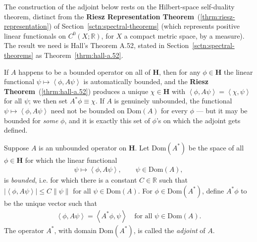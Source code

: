 The construction of the adjoint below rests on the Hilbert-space self-duality theorem, distinct from the \textbf{Riesz Representation Theorem}~(\ref{thrm:riesz-representation}) of Section~\ref{sctn:spectral-theorems} (which represents positive linear functionals on $C^0(X;\mathbb{R})$, for $X$ a compact metric space, by a measure). The result we need is Hall's Theorem A.52, stated in Section~\ref{sctn:spectral-theorems} as Theorem~\ref{thrm:hall-a.52}.

If $A$ happens to be a bounded operator on all of $\mathbf{H}$, then for any $\phi \in \mathbf{H}$ the linear functional $\psi \mapsto \left< \phi, A\psi \right>$ is automatically bounded, and the \textbf{Riesz Theorem}~(\ref{thrm:hall-a.52}) produces a unique $\chi \in \mathbf{H}$ with $\left< \phi, A\psi \right> = \left< \chi, \psi \right>$ for all $\psi$; we then set $A^*\phi \equiv \chi$. If $A$ is genuinely unbounded, the functional $\psi \mapsto \left< \phi, A\psi \right>$ need not be bounded on $\text{Dom}(A)$ for every $\phi$ — but it may be bounded for \textit{some} $\phi$, and it is exactly this set of $\phi$'s on which the adjoint gets defined.

\begin{definition}
    \label{def:hall-9.1}
    \leanok
    Suppose $A$ is an unbounded operator on $\mathbf{H}$. Let $\text{Dom}(A^*)$ be the space of all $\phi \in \mathbf{H}$ for which the linear functional
    \begin{align}
        \psi \longmapsto \left< \phi, A\psi \right>, \qquad \psi \in \text{Dom}(A),
    \end{align}
    is \textit{bounded}, i.e. for which there is a constant $C \in \mathbb{R}$ such that $\lvert \left< \phi, A\psi \right> \rvert \le C \left\| \psi \right\|$ for all $\psi \in \text{Dom}(A)$. For $\phi \in \text{Dom}(A^*)$, define $A^*\phi$ to be the unique vector such that
    \begin{align}
        \left< \phi, A\psi \right> = \left< A^*\phi, \psi \right> \quad \text{for all } \psi \in \text{Dom}(A).
    \end{align}
    The operator $A^*$, with domain $\text{Dom}(A^*)$, is called the \textit{adjoint} of $A$.
\end{definition}


